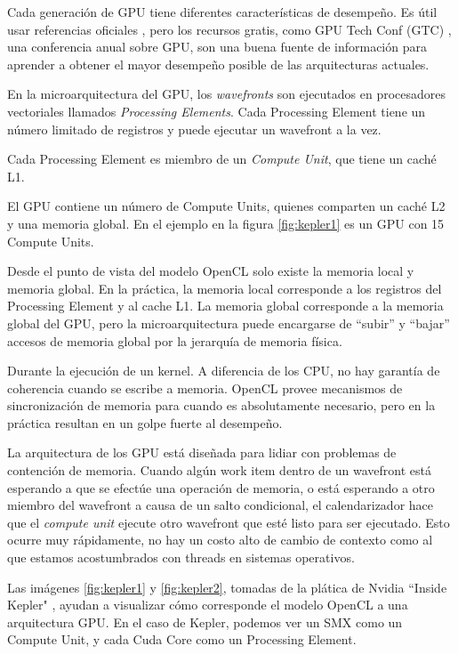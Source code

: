 Cada generación de GPU tiene diferentes características de desempeño. Es útil
usar referencias oficiales \cite{maxwell-tuning}, pero los recursos gratis,
como GPU Tech Conf (GTC) \cite{gtc}, una conferencia anual sobre GPU, son una
buena fuente de información para aprender a obtener el mayor desempeño posible
de las arquitecturas actuales.

En la microarquitectura del GPU, los \emph{wavefronts} son ejecutados en
procesadores vectoriales llamados \emph{Processing Elements}. Cada Processing
Element tiene un número limitado de registros y puede ejecutar un wavefront a la vez.

Cada Processing Element es miembro de un \emph{Compute Unit}, que tiene un caché L1.

El GPU contiene un número de Compute Units, quienes comparten un caché L2 y una
memoria global. En el ejemplo en la figura \ref{fig:kepler1} es un GPU con 15
Compute Units.

Desde el punto de vista del modelo OpenCL solo existe la memoria local y
memoria global. En la práctica, la memoria local corresponde a los registros
del Processing Element y al cache L1. La memoria global corresponde a la
memoria global del GPU, pero la microarquitectura puede encargarse de ``subir''
y ``bajar''  accesos de memoria global por la jerarquía de memoria física.

Durante la ejecución de un kernel. A diferencia de los CPU, no hay garantía de
coherencia cuando se escribe a memoria. OpenCL provee mecanismos de
sincronización de memoria para cuando es absolutamente necesario, pero en la
práctica resultan en un golpe fuerte al desempeño.

La arquitectura de los GPU está diseñada para lidiar con problemas de
contención de memoria. Cuando algún work item dentro de un wavefront está
esperando a que se efectúe una operación de memoria, o está esperando a otro
miembro del wavefront a causa de un salto condicional, el calendarizador hace
que el \emph{compute unit} ejecute otro wavefront que esté listo para ser
ejecutado. Esto ocurre muy rápidamente, no hay un costo alto de cambio de
contexto como al que estamos acostumbrados con threads en sistemas operativos.

Las imágenes \ref{fig:kepler1} y \ref{fig:kepler2}, tomadas de la plática de
Nvidia ``Inside Kepler" \cite{kepler-slides}, ayudan a visualizar cómo
corresponde el modelo OpenCL a una arquitectura GPU. En el caso de Kepler,
podemos ver un SMX como un Compute Unit, y cada Cuda Core como un Processing
Element.

